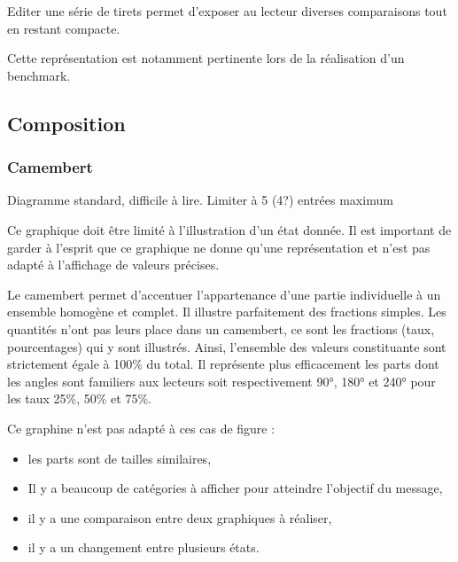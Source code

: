 \documentclass[a4paper,12pt]{article}
\begin{document}
\begin{multicols}{2}
Editer une série de tirets permet d'exposer au lecteur diverses comparaisons tout en restant compacte. \autocite{jonathanschwabishComparingCategories2021}

Cette représentation est notamment pertinente lors de la réalisation d'un benchmark. \autocite{mikeyiHowChooseRight2020}
\subsection{Composition}
\label{sec:org1a942d3}
\subsubsection{Camembert}
\label{sec:org736fd24}
Diagramme standard, difficile à lire. \autocite{alansmithLexiqueVisuel}
Limiter à 5 (4?) entrées maximum \autocite{mikeyiHowChooseRight2020}

Ce graphique doit être limité à l'illustration d'un état donnée. Il est important de garder à l'esprit que ce graphique ne donne qu'une représentation et n'est pas adapté à l'affichage de valeurs précises. \autocite{jonathanschwabishParttowhole2021}

Le camembert permet d'accentuer l'appartenance d'une partie individuelle à un ensemble homogène et complet. Il illustre parfaitement des fractions simples.\autocite{wilkeDirectoryVisualizations2019} Les quantités n'ont pas leurs place dans un camembert, ce sont les fractions (taux, pourcentages) qui y sont illustrés. Ainsi, l'ensemble des valeurs constituante sont strictement égale à 100\% du total.\autocite{wilkeVisualizingAmounts2019} Il représente plus efficacement les parts dont les angles sont familiers aux lecteurs soit respectivement 90°, 180° et 240° pour les taux 25\%, 50\% et 75\%.

Ce graphine n'est pas adapté à ces cas de figure :
\begin{itemize}
\item les parts sont de tailles similaires,\autocite{sosulskiGraphics2019}
\item Il y a beaucoup de catégories à afficher pour atteindre l'objectif du message,
\item il y a une comparaison entre deux graphiques à réaliser,\autocite{jonathanschwabishParttowhole2021}
\item il y a un changement entre plusieurs états.\autocite{wilkeDirectoryVisualizations2019}
\end{itemize}


\end{multicols}
\end{document}
